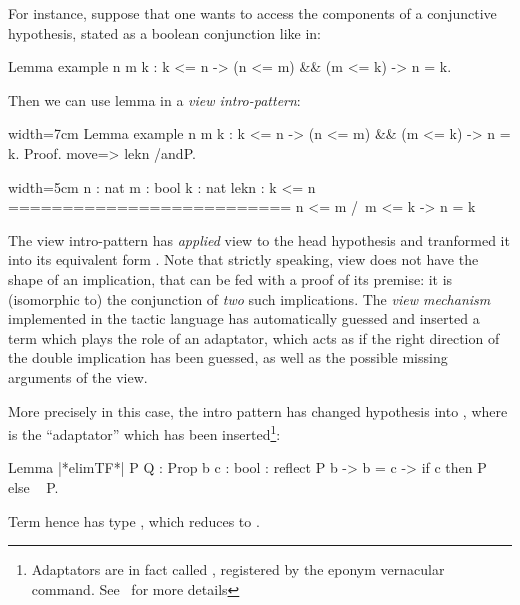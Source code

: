 For instance, suppose that one wants to access the components of a
conjunctive hypothesis, stated as a boolean conjunction like in:

\begin{coq}{}{}
Lemma example n m k : k <= n -> (n <= m) && (m <= k) -> n = k.
\end{coq}

Then we can use lemma  in a \emph{view intro-pattern}:

\begin{coq}{}{width=7cm}
Lemma example n m k :
  k <= n ->
    (n <= m) && (m <= k) -> n = k.
Proof.
move=> lekn /andP.
\end{coq}
\begin{coqout}{}{width=5cm}
n : nat
m : bool
k : nat
lekn : k <= n
==========================
 n <= m /\ m <= k ->
   n = k
\end{coqout}

The view intro-pattern  has \emph{applied} view  to
the head hypothesis  and tranformed it into
its equivalent form . Note that strictly
speaking, view  does not have the shape of an implication,
that can be fed with a proof of its premise: it is (isomorphic to) the
conjunction of \emph{two} such implications. The \emph{view mechanism}
implemented in the tactic language has automatically guessed and
inserted a term which plays the role of an adaptator, which acts as if
the right direction of the double implication has been guessed, as
well as the possible missing arguments of the view.

More precisely in this case, the  intro pattern has changed
hypothesis  into
,
where  is the ``adaptator'' which has been
inserted\footnote{Adaptators are in fact called ,
  registered by the eponym vernacular command. See~\cite{ssrman} for
  more details}:

\begin{coq}{}{}
Lemma |*elimTF*| {P Q : Prop} {b c : bool} :
  reflect P b -> b = c -> if c then P else ~ P.
\end{coq}
Term  hence has type
,
which reduces to .

